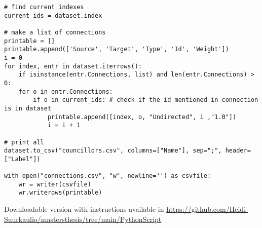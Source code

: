 \begin{small}
\begin{verbatim}
# find current indexes
current_ids = dataset.index

# make a list of connections
printable = []
printable.append(['Source', 'Target', 'Type', 'Id', 'Weight'])
i = 0
for index, entr in dataset.iterrows():
    if isinstance(entr.Connections, list) and len(entr.Connections) > 0:
    for o in entr.Connections:
        if o in current_ids: # check if the id mentioned in connection is in dataset
            printable.append([index, o, "Undirected", i ,"1.0"])
            i = i + 1

# print all
dataset.to_csv("councillors.csv", columns=["Name"], sep=";", header=["Label"])

with open("connections.csv", "w", newline='') as csvfile:
    wr = writer(csvfile)
    wr.writerows(printable)
\end{verbatim}
\end{small}

Downloadable version with instructions available in \url{https://github.com/Heidi-Suurkaulio/mastersthesis/tree/main/PythonScript}